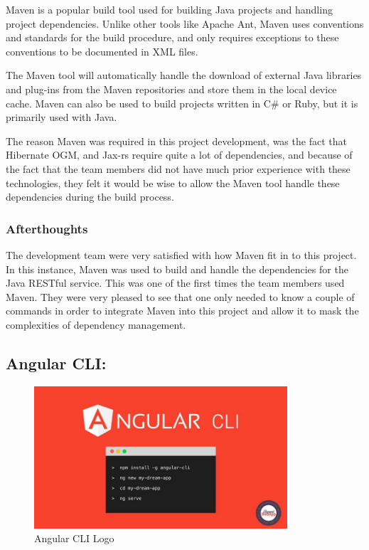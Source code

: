 Maven is a popular build tool used for building Java projects and handling project dependencies. Unlike other tools like Apache Ant, Maven uses conventions and standards for the build procedure, and only requires exceptions to these conventions to be documented in XML files. 

The Maven tool will automatically handle the download of external Java libraries and plug-ins from the Maven repositories and store them in the local device cache. Maven can also be used to build projects written in C\# or Ruby, but it is primarily used with Java. 

\bigskip

The reason Maven was required in this project development, was the fact that Hibernate OGM, and Jax-rs require quite a lot of dependencies, and because of the fact that the team members did not have much prior experience with these technologies, they felt it would be wise to allow the Maven tool handle these dependencies during the build process.

\subsubsection{Afterthoughts}
The development team were very satisfied with how Maven fit in to this project. In this instance, Maven was used to build and handle the dependencies for the Java RESTful service. This was one of the first times the team members used Maven. They were very pleased to see that one only needed to know a couple of commands in order to integrate Maven into this project and allow it to mask the complexities of dependency management.

\subsection{Angular CLI:}
\label{sec:TechnologyReviewCLI}

\begin{figure}[H]
    \centering
    \includegraphics[width=\textwidth, height=150pt]{img/AngularCliLogo.jpeg}
    \caption{Angular CLI Logo}
    \label{fig:my_label}
\end{figure}

